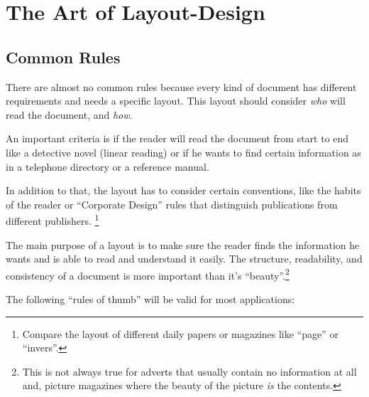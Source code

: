 \documentclass[twoside,a4paper]{refart}
\begin{document}
\section{The Art of Layout-Design}
\label{design}
\label{Layout-Design}

\subsection{Common Rules}

There are almost no common rules because every kind of document has 
different requirements and needs a specific layout. This layout 
should consider \emph{who} will read the document, and \emph{how}.

An important criteria is if the reader will read the document from 
start to end like a detective novel (linear reading) or if he wants to 
find certain information as in a telephone directory or a 
reference manual.  

In addition to that, the layout has to consider certain conventions, 
like the habits of the reader or ``Corporate Design''  rules that distinguish publications from different publishers.  
\footnote{Compare the layout of different daily papers or magazines 
like ``page'' or ``invers''.}

\attention
The main purpose of a layout is to make sure the reader finds the 
information he wants and is able to read and understand it easily.
The structure, readability, and consistency of a document is more 
important than it's ``beauty''.\footnote{This is not always true for 
adverts that usually contain no information at all and, picture 
magazines where the beauty of the picture \emph{is} the contents.}

The following ``rules of thumb'' will be valid 
for most applications:
\end{document}
